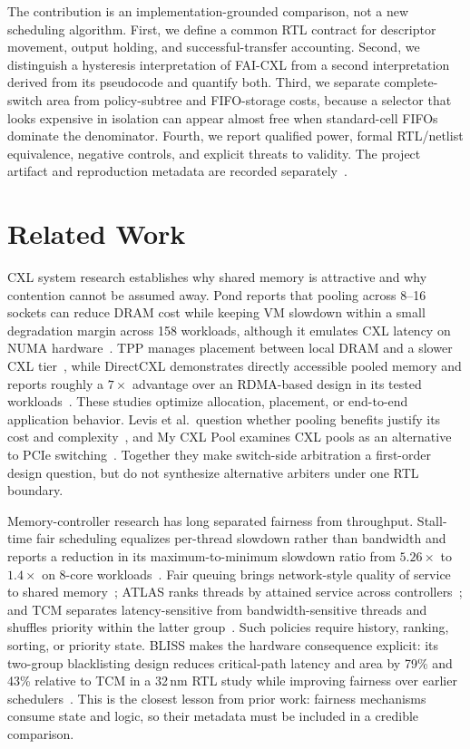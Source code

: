 The contribution is an implementation-grounded comparison, not a new scheduling algorithm. First, we define a common RTL contract for descriptor movement, output holding, and successful-transfer accounting. Second, we distinguish a hysteresis interpretation of FAI-CXL from a second interpretation derived from its pseudocode and quantify both. Third, we separate complete-switch area from policy-subtree and FIFO-storage costs, because a selector that looks expensive in isolation can appear almost free when standard-cell FIFOs dominate the denominator. Fourth, we report qualified power, formal RTL/netlist equivalence, negative controls, and explicit threats to validity. The project artifact and reproduction metadata are recorded separately~\cite{artifact}.

\section{Related Work}
CXL system research establishes why shared memory is attractive and why contention cannot be assumed away. Pond reports that pooling across 8--16 sockets can reduce DRAM cost while keeping VM slowdown within a small degradation margin across 158 workloads, although it emulates CXL latency on NUMA hardware~\cite{pond}. TPP manages placement between local DRAM and a slower CXL tier~\cite{tpp}, while DirectCXL demonstrates directly accessible pooled memory and reports roughly a $7\times$ advantage over an RDMA-based design in its tested workloads~\cite{directcxl}. These studies optimize allocation, placement, or end-to-end application behavior. Levis et al.\ question whether pooling benefits justify its cost and complexity~\cite{case_pool}, and My CXL Pool examines CXL pools as an alternative to PCIe switching~\cite{my_cxl_pool}. Together they make switch-side arbitration a first-order design question, but do not synthesize alternative arbiters under one RTL boundary.

Memory-controller research has long separated fairness from throughput. Stall-time fair scheduling equalizes per-thread slowdown rather than bandwidth and reports a reduction in its maximum-to-minimum slowdown ratio from $5.26\times$ to $1.4\times$ on 8-core workloads~\cite{stfm}. Fair queuing brings network-style quality of service to shared memory~\cite{fqmem}; ATLAS ranks threads by attained service across controllers~\cite{atlas}; and TCM separates latency-sensitive from bandwidth-sensitive threads and shuffles priority within the latter group~\cite{tcm}. Such policies require history, ranking, sorting, or priority state. BLISS makes the hardware consequence explicit: its two-group blacklisting design reduces critical-path latency and area by 79\% and 43\% relative to TCM in a 32\,nm RTL study while improving fairness over earlier schedulers~\cite{bliss}. This is the closest lesson from prior work: fairness mechanisms consume state and logic, so their metadata must be included in a credible comparison.

